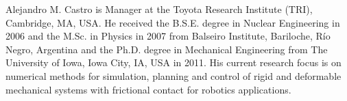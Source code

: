 \begin{IEEEbiography}{Alejandro
M. Castro} is Manager at the Toyota Research Institute (TRI), Cambridge, MA, USA.
He received the B.S.E. degree in Nuclear Engineering in 2006 and the M.Sc. in
Physics in 2007 from Balseiro Institute, Bariloche, R\'io Negro, Argentina and
the Ph.D. degree in Mechanical Engineering from The University of Iowa,
Iowa City, IA, USA in 2011. His current research focus is on numerical methods
for simulation, planning and control of rigid and deformable mechanical systems
with frictional contact for robotics applications.
\end{IEEEbiography}
